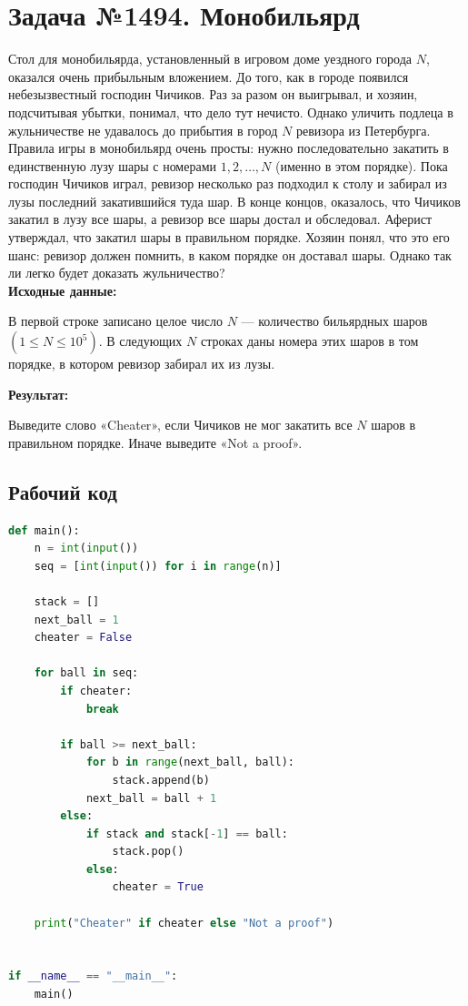 \documentclass[a4paper,12pt]{article}
\begin{document}
\section*{Задача №1494. Монобильярд}
Стол для монобильярда, установленный в игровом доме уездного города $N$, оказался очень прибыльным вложением. До того, как в городе появился небезызвестный господин Чичиков. Раз за разом он выигрывал, и хозяин, подсчитывая убытки, понимал, что дело тут нечисто. Однако уличить подлеца в жульничестве не удавалось до прибытия в город $N$ ревизора из Петербурга.\\[0.5em]
Правила игры в монобильярд очень просты: нужно последовательно закатить в единственную лузу шары с номерами $1, 2, \dots, N$ (именно в этом порядке). Пока господин Чичиков играл, ревизор несколько раз подходил к столу и забирал из лузы последний закатившийся туда шар. В конце концов, оказалось, что Чичиков закатил в лузу все шары, а ревизор все шары достал и обследовал. Аферист утверждал, что закатил шары в правильном порядке. Хозяин понял, что это его шанс: ревизор должен помнить, в каком порядке он доставал шары. Однако так ли легко будет доказать жульничество?\\[1em]
\textbf{Исходные данные:}
\begin{quotebox}
    В первой строке записано целое число $N$ — количество бильярдных шаров $(1 \leq N \leq 10^5)$. В следующих $N$ строках даны номера этих шаров в том порядке, в котором ревизор забирал их из лузы.
\end{quotebox}
\textbf{Результат:}
\begin{quotebox}
    Выведите слово «Cheater», если Чичиков не мог закатить все $N$ шаров в правильном порядке. Иначе выведите «Not a proof».
\end{quotebox}
\subsection*{Рабочий код}
\begin{lstlisting}[language=python]
def main():
    n = int(input())
    seq = [int(input()) for i in range(n)]

    stack = []
    next_ball = 1
    cheater = False

    for ball in seq:
        if cheater:
            break

        if ball >= next_ball:
            for b in range(next_ball, ball):
                stack.append(b)
            next_ball = ball + 1
        else:
            if stack and stack[-1] == ball:
                stack.pop()
            else:
                cheater = True

    print("Cheater" if cheater else "Not a proof")


if __name__ == "__main__":
    main()
\end{lstlisting}
\end{document}
